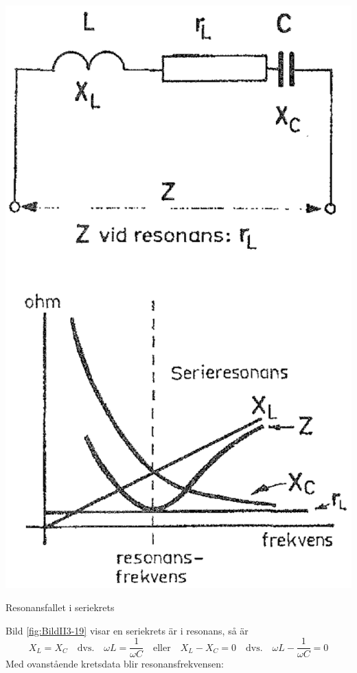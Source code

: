 \begin{marginfigure}
  \includegraphics[width=\textwidth]{images/cropped_pdfs/bild_2_3-19.pdf}
  \caption{Resonansfallet i seriekrets}
  \label{fig:BildII3-19}
\end{marginfigure}

Bild \ref{fig:BildII3-19} visar en seriekrets är i resonans, så är
\[
 X_L = X_C 
 \quad\text{dvs.}\quad
 \omega L = \frac{1}{\omega C} 
 \quad\text{eller}\quad
 X_L - X_C = 0 
 \quad\text{dvs.}\quad
 \omega L - \frac{1}{\omega C} = 0
\]
Med ovanstående kretsdata blir resonansfrekvensen:

